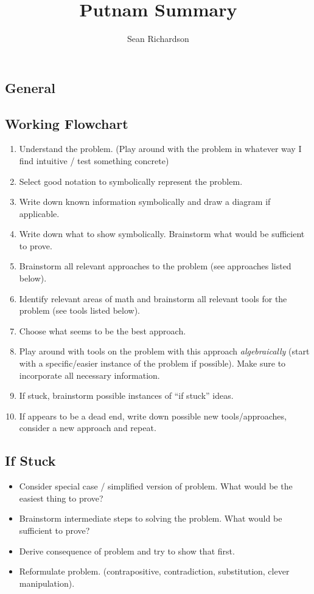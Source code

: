 \documentclass[12pt]{amsart}
\begin{document}
\title{Putnam Summary}
\author{Sean Richardson}
\maketitle
\begin{multicols}{2}
\section{General}
\subsection{Working Flowchart}
\begin{enumerate}
    \item Understand the problem. (Play around with the problem in whatever
        way I find intuitive / test something concrete)
    \item Select good notation to symbolically represent the problem.
    \item Write down known information symbolically and draw a diagram if applicable.
    \item Write down what to show symbolically. Brainstorm what would be
        sufficient to prove.
    \item Brainstorm all relevant approaches to the problem (see approaches
        listed below).
    \item Identify relevant areas of math and brainstorm all relevant tools
        for the problem (see tools listed below).
    \item Choose what seems to be the best approach.
    \item Play around with tools on the problem with this approach
        \emph{algebraically} (start
        with a specific/easier instance of the problem if possible). Make
        sure to incorporate all necessary information.
    \item If stuck, brainstorm possible instances of ``if stuck'' ideas.
    \item If appears to be a dead end, write down possible new
        tools/approaches, consider a new approach and repeat.
\end{enumerate}

\subsection{If Stuck}
\begin{itemize}
    \item Consider special case / simplified version of problem. What would
        be the easiest thing to prove?
    \item Brainstorm intermediate steps to solving the problem. What would
        be sufficient to prove?
    \item Derive consequence of problem and try to show that first.
    \item Reformulate problem. (contrapositive, contradiction, substitution, clever manipulation).
\end{itemize}


\end{multicols}
\end{document}
